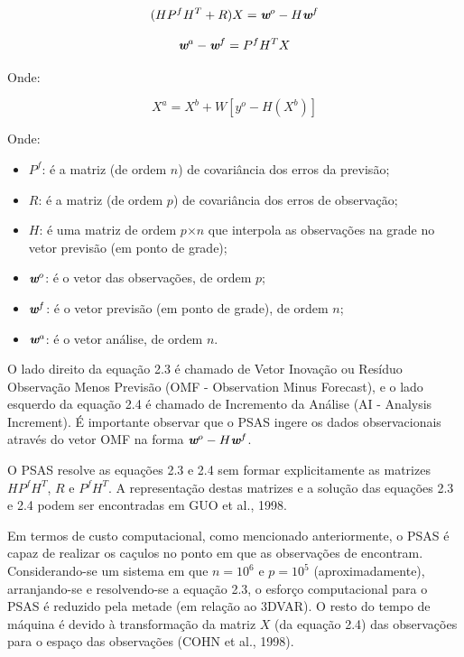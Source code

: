 \begin{equation}
(HP^{f}H^{T}+R)X=\textit{\textbf{w}}^o-H\textit{\textbf{w}}^f
\label{form06}
\end{equation}

\begin{equation}
\textit{\textbf{w}}^a-\textit{\textbf{w}}^f=P^{f}H^{T}X
\label{form07}
\end{equation}

Onde:

\begin{equation}
X^{a}=X^{b}+W[y^{o}-H(X^{b})]
\label{form08}
\end{equation}

Onde:

\begin{itemize}
\item $P^{f}$: é a matriz (de ordem $n$) de covariância dos erros da previsão;
\item $R$: é a matriz (de ordem $p$) de covariância dos erros de observação;
\item $H$: é uma matriz de ordem $p$$\times$$n$ que interpola as observações na grade no vetor previsão (em ponto de grade);
\item $\textit{\textbf{w}}^o$: é o vetor das observações, de ordem $p$;
\item $\textit{\textbf{w}}^f$: é o vetor previsão (em ponto de grade), de ordem $n$;
\item $\textit{\textbf{w}}^a$: é o vetor análise, de ordem $n$.
\end{itemize}

O lado direito da equação 2.3 é chamado de Vetor Inovação ou Resíduo Observação Menos Previsão (OMF - Observation Minus Forecast), e o lado esquerdo da equação 2.4 é chamado de Incremento da Análise (AI - Analysis Increment). É importante observar que o PSAS ingere os dados observacionais através do vetor OMF na forma $\textit{\textbf{w}}^o-H\textit{\textbf{w}}^f$.

O PSAS resolve as equações 2.3 e 2.4 sem formar explicitamente as matrizes $HP^{f}H^{T}$, $R$ e $P^{f}H^{T}$. A representação destas matrizes e a solução das equações 2.3 e 2.4 podem ser encontradas em GUO et al., 1998.

Em termos de custo computacional, como mencionado anteriormente, o PSAS é capaz de realizar os caçulos no ponto em que as observações de encontram. Considerando-se um sistema em que $n=10^{6}$ e $p=10^{5}$ (aproximadamente), arranjando-se e resolvendo-se a equação 2.3, o esforço computacional para o PSAS é reduzido pela metade (em relação ao 3DVAR). O resto do tempo de máquina é devido à transformação da matriz $X$ (da equação 2.4) das observações para o espaço das observações (COHN et al., 1998).

